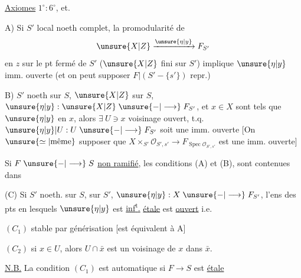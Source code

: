 \uline{Axiomes} $1^\circ:6^\circ$, et.

A) Si $S'$ local noeth complet,  la promodularité de
\[
 \unsure{X|Z}\xrightarrow{\unsure{\eta|y}}F_{S'}
\]
en $z$ sur le pt fermé de $S'$ ($\unsure{X|Z}$ fini sur $S'$) implique $\unsure{\eta|y}$  imm. ouverte (et on peut supposer $F|(S'-\{s'\})$ repr.)

B)  $S'$ noeth sur $S$, $\unsure{X|Z}$ sur $S$, $\unsure{\eta|y}:\unsure{X|Z}\mathrel{\unsure{-|\longrightarrow}}F_{S'}$, et $x\in X$ sont tels que $\unsure{\eta|y}$  en $x$, alors $\exists\ U\ni x$ voisinage ouvert, t.q. $\unsure{\eta|y}|U:U\mathrel{\unsure{-|\longrightarrow}}F_{S'}$ soit une imm. ouverte [On  $\unsure{\simeq|\text{même}}$ supposer que $X\times_{S'}\mathcal O_{S',s'}\longrightarrow F_{\operatorname{Spec}\mathcal O_{S',s'}}$ est une imm. ouverte]





Si $F\mathrel{\unsure{-|\longrightarrow}}S$ \uline{non ramifié}, les conditions (A) et (B), sont  contenues dans

(C) Si $S'$ noeth. sur $S$,    sur $S'$, $\unsure{\eta|y}:X\mathrel{\unsure{-|\longrightarrow}}F_{S'}$, l'ens  des pts en lesquels $\unsure{\eta|y}$ est \uline{inf\textsuperscript{t}.} \uline{étale} est \uline{ouvert} i.e.

$(C_1)$ stable par générisation [est  équivalent à A]

$(C_2)$ si $x\in U$, alors  $U\cap\bar x$ est un voisinage de $x$ dans $\bar x$.

\uline{N.B.} La condition $(C_1)$ est automatique si $F\longrightarrow S$ est \uline{étale}
